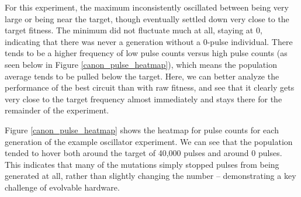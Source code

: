 \documentclass{ieeeaccess}
\newcommand{\highlight}[1]{#1}
\begin{document}
\begin{appendices}

For this experiment, the maximum inconsistently oscillated between being very large or being near the target\highlight{, though eventually settled down very close to the target fitness. The minimum did not fluctuate much at all, staying at 0, indicating that there was never a generation without a 0-pulse individual}. There tends to be a higher frequency of low pulse counts versus high pulse counts (as seen below in Figure \ref{canon_pulse_heatmap}), which means the population average tends to be pulled below the target. Here, we can better analyze the performance of the best circuit than with raw fitness, and see that it clearly gets very close to the target frequency \highlight{almost immediately} and stays there for the remainder of the experiment.

Figure \ref{canon_pulse_heatmap} shows the heatmap for pulse counts for each generation of the example oscillator experiment. \highlight{We can see that the population tended to hover both around the target of 40,000 pulses and around 0 pulses. This indicates that many of the mutations simply stopped pulses from being generated at all, rather than slightly changing the number -- demonstrating a key challenge of evolvable hardware.}



\end{appendices}
\end{document}
